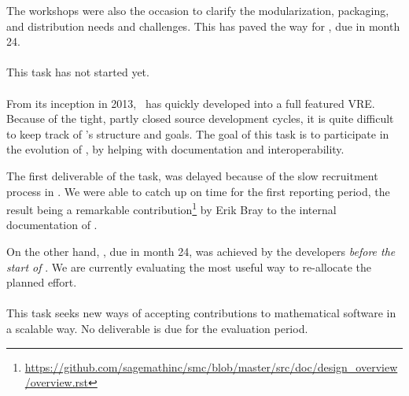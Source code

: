 \documentclass{deliverablereport}
\begin{document}
  The workshops were also the occasion to clarify the modularization,
  packaging, and distribution needs and challenges. This has paved the
  way for , due
  in month 24.
  
  \paragraph{}
  \TODO{}
  
  \paragraph{}
  This task has not started yet.

  \paragraph{}
  From its inception in 2013, \SMC\ has quickly developed into a full
  featured VRE.  Because of the tight, partly closed source
  development cycles, it is quite difficult to keep track of \SMC's
  structure and goals.  The goal of this task is to participate in the
  evolution of \SMC, by helping with documentation and
  interoperability.

  The first deliverable of the task,
   was delayed
  because of the slow recruitment process in . We were able
  to catch up on time for the first reporting period, the result being
  a remarkable
  contribution\footnote{\url{https://github.com/sagemathinc/smc/blob/master/src/doc/design_overview/overview.rst}}
  by Erik Bray to the internal documentation of \SMC.
  
  On the other hand,
  , due in month
  24, was achieved by the \SMC developers \emph{before the start of
    \ODK}. We are currently evaluating the most useful way to
  re-allocate the planned effort.
  
  \paragraph{}
  This task seeks new ways of accepting contributions to mathematical
  software in a scalable way.  No deliverable is due for the
  evaluation period.
  
\end{document}
